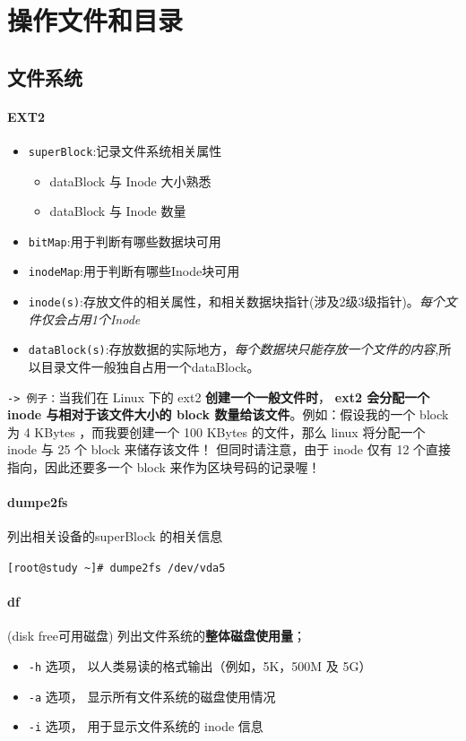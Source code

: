 \documentclass[UTF8,a4paper,12pt]{ctexbook}
\begin{document}
	\section{操作文件和目录}
		\subsection{文件系统}
			\paragraph{EXT2}
				\begin{itemize}
					\item \verb|superBlock|:记录文件系统相关属性
						\begin{itemize}
							\item dataBlock 与 Inode 大小熟悉
							\item dataBlock 与 Inode 数量
						\end{itemize}
					\item \verb|bitMap|:用于判断有哪些数据块可用
					\item \verb|inodeMap|:用于判断有哪些Inode块可用
					\item \verb|inode(s)|:存放文件的相关属性，和相关数据块指针(涉及2级3级指针)。\textit{每个文件仅会占用1个Inode}
					\item \verb|dataBlock(s)|:存放数据的实际地方，\textit{每个数据块只能存放一个文件的内容},所以目录文件一般独自占用一个dataBlock。
				\end{itemize}
				
				\verb|-> 例子：|当我们在 Linux 下的 ext2 \textbf{创建一个一般文件时}， \textbf{ext2 会分配一个 inode 与相对于该文件大小的 block 数量给该文件}。例如：假设我的一个 block 为 4 KBytes ，而我要创建一个 100 KBytes 的文件，那么 linux 将分配一个 inode 与 25 个 block 来储存该文件！ 但同时请注意，由于 inode 仅有 12 个直接指向，因此还要多一个 block 来作为区块号码的记录喔！

			\paragraph{dumpe2fs}列出相关设备的superBlock 的相关信息
				
				\verb|[root@study ~]# dumpe2fs /dev/vda5|
			\paragraph{df}(disk free可用磁盘) 列出文件系统的\textbf{整体磁盘使用量}；
				\begin{itemize}
					\item \verb|-h| 选项， 以人类易读的格式输出（例如，5K，500M 及 5G）
					\item \verb|-a| 选项， 显示所有文件系统的磁盘使用情况
					\item \verb|-i| 选项， 用于显示文件系统的 inode 信息
				\end{itemize}
			
\end{document}
